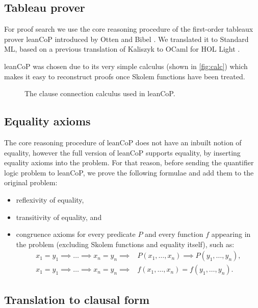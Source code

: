 \documentclass[]{article}
\providecommand{\tightlist}{%
  \setlength{\itemsep}{0pt}\setlength{\parskip}{0pt}}
\begin{document}
\subsection{Tableau prover}\label{tableau-prover}

For proof search we use the core reasoning procedure of the first-order
tableaux prover leanCoP introduced by Otten and Bibel
\citep{otten2003-leancop, otten2008-leancop}. We translated it to
Standard ML, based on a previous translation of Kaliszyk to OCaml for
HOL Light \citep{kaliszyk2015-leancop}.

leanCoP was chosen due to its very simple calculus (shown in
\autoref{fig:calc}) which makes it easy to reconstruct proofs once
Skolem functions have been treated.

\begin{figure}[t!]

\caption{\label{fig:calc}The clause connection calculus used in leanCoP.}
\end{figure}

\subsection{Equality axioms}\label{equality-axioms}

The core reasoning procedure of leanCoP does not have an inbuilt notion
of equality, however the full version of leanCoP supports equality, by
inserting equality axioms into the problem. For that reason, before
sending the quantifier logic problem to leanCoP, we prove the following
formulae and add them to the original problem:

\begin{itemize}
\tightlist
\item
  reflexivity of equality,
\item
  transitivity of equality, and
\item
  congruence axioms for every predicate \(P\) and every function \(f\)
  appearing in the problem (excluding Skolem functions and equality
  itself), such as: \[\begin{split}
  x_1 = y_1 \implies \dots \implies x_n = y_n \implies &
    P(x_1, \dots, x_n) \implies P(y_1, \dots, y_n), \\
  x_1 = y_1 \implies \dots \implies x_n = y_n \implies &
    f(x_1, \dots, x_n) = f(y_1, \dots, y_n).
    \end{split}\]
\end{itemize}

\subsection{Translation to clausal
form}\label{translation-to-clausal-form}
\end{document}
